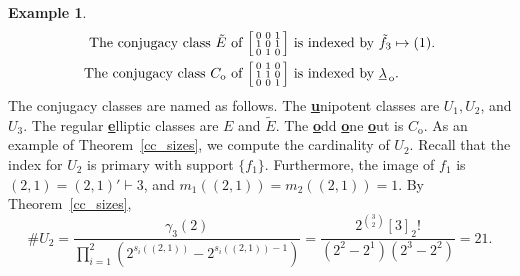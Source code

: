 \documentclass[10pt]{article}
\theoremstyle{definition}
\newtheorem{example}[theorem]{Example}
\newcommand{\ulambda}{{\underline{\lambda}}}
\newcommand{\uline}[1]{{\underline{#1}}}
\begin{document}
\begin{example}
\begin{align*}
\text{The conjugacy class } \tilde{E} \text{ of }
\begin{bsmallmatrix}
0 & 0 & 1 \\
1 & 0 & 1 \\
0 & 1 & 0
\end{bsmallmatrix}
&
\text{ is indexed by }
\tilde{f}_3 \mapsto (1). \\
\text{The conjugacy class } C_{\mathrm{o}} \text{ of }
\begin{bsmallmatrix}
0 & 1 & 0 \\
1 & 1 & 0 \\
0 & 0 & 1
\end{bsmallmatrix}
&
\text{ is indexed by }
\ulambda_{\,\mathrm{o}}.
\end{align*}
The conjugacy classes are named as follows.
The \uline{\textbf{u}}nipotent classes are $U_1, U_2$, and $U_3$. The regular \uline{\textbf{e}}lliptic classes are $E$ and $\tilde{E}$. The \uline{\textbf{o}}dd \uline{\textbf{o}}ne \uline{\textbf{o}}ut is $C_{\mathrm{o}}$.
As an example of Theorem~\ref{cc_sizes}, we compute the cardinality of \(U_2\).
Recall that the index for \(U_2\) is primary with support \(\{f_1\}\).
Furthermore, the image of \(f_1\) is \((2,1) = (2,1)' \vdash 3\), and \(m_1((2,1)) = m_2((2,1)) = 1\).
By Theorem~\ref{cc_sizes},
\begin{equation}
\# U_2
=
\frac{\gamma_3(2)}{
\prod_{i = 1}^2
\left (
2^{s_i((2,1))}
-
2^{s_i((2,1)) - 1}
\right )
}
=
\frac{2^{\binom{3}{2}} [3]_2 !}{(2^2 - 2^1)(2^3 - 2^2)}
=
21.
\end{equation}

\end{example}
\end{document}
